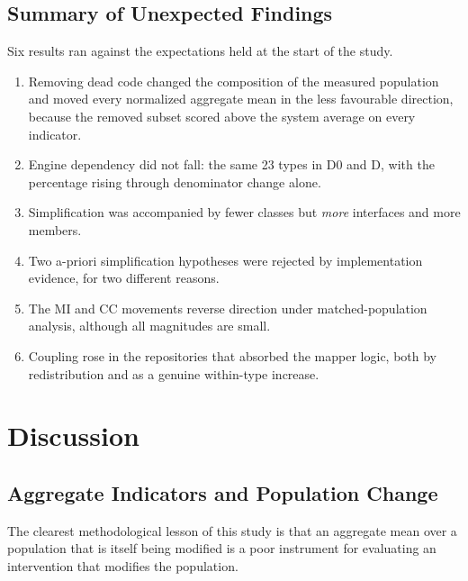 \documentclass[pdflatex,sn-basic]{sn-jnl}
\begin{document}
\subsection{Summary of Unexpected Findings}

Six results ran against the expectations held at the start of the study.

\begin{enumerate}\itemsep2pt
\item Removing dead code changed the composition of the measured population and moved every normalized aggregate mean in the less favourable direction, because the removed subset scored above the system average on every indicator.
\item Engine dependency did not fall: the same 23 types in D0 and D, with the percentage rising through denominator change alone.
\item Simplification was accompanied by fewer classes but \emph{more} interfaces and more members.
\item Two a-priori simplification hypotheses were rejected by implementation evidence, for two different reasons.
\item The MI and CC movements reverse direction under matched-population analysis, although all magnitudes are small.
\item Coupling rose in the repositories that absorbed the mapper logic, both by redistribution and as a genuine within-type increase.
\end{enumerate}


\FloatBarrier

\section{Discussion}\label{sec:discussion}

\subsection{Aggregate Indicators and Population Change}

The clearest methodological lesson of this study is that an aggregate mean over a population that is itself being modified is a poor instrument for evaluating an intervention that modifies the population.
\end{document}
